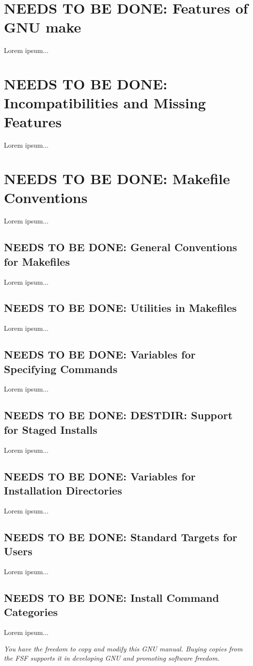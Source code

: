 \documentclass{charun}
\begin{document}
\begin{multicols*}{2}
\color{gray}
\section{NEEDS TO BE DONE: Features of GNU make}
Lorem ipsum...
\color{black}

\color{gray}
\section{NEEDS TO BE DONE: Incompatibilities and Missing Features}
Lorem ipsum...
\color{black}

\color{gray}
\section{NEEDS TO BE DONE: Makefile Conventions}
Lorem ipsum...
\color{black}


\color{gray}
\subsection{NEEDS TO BE DONE: General Conventions for Makefiles}
Lorem ipsum...
\color{black}

\color{gray}
\subsection{NEEDS TO BE DONE: Utilities in Makefiles}
Lorem ipsum...
\color{black}

\color{gray}
\subsection{NEEDS TO BE DONE: Variables for Specifying Commands}
Lorem ipsum...
\color{black}

\color{gray}
\subsection{NEEDS TO BE DONE: DESTDIR: Support for Staged Installs}
Lorem ipsum...
\color{black}

\color{gray}
\subsection{NEEDS TO BE DONE: Variables for Installation Directories}
Lorem ipsum...
\color{black}

\color{gray}
\subsection{NEEDS TO BE DONE: Standard Targets for Users}
Lorem ipsum...
\color{black}

\color{gray}
\subsection{NEEDS TO BE DONE: Install Command Categories}
Lorem ipsum...
\color{black}



\emph{You have the freedom to copy and modify this GNU manual. Buying copies from the FSF supports it in developing GNU and promoting software freedom.}
\end{multicols*}
\end{document}
